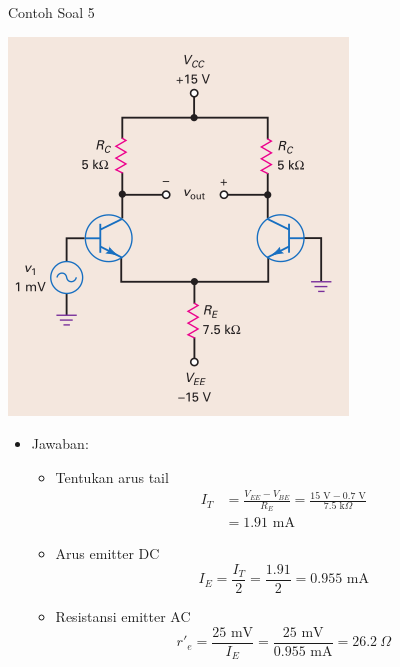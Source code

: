 \documentclass[aspectratio=169]{beamer}
\begin{document}
\begin{frame}{Contoh Soal 5}
	\begin{multicols}{2}
		\begin{center}
			\includegraphics[height=0.7\textheight]{gambar/01.contoh_soal_1-2}
		\end{center}
		\columnbreak
		\begin{itemize}
			\item Jawaban:
			\begin{itemize}
				\item Tentukan arus tail
				\begin{align*}
					I_T &= \frac{V_{EE} - V_{BE}}{R_E} = \frac{15 \text{ V} - 0.7 \text{ V}}{7.5 \text{ k}\Omega} \\
					&= 1.91 \text{ mA}
				\end{align*}
				\item Arus emitter DC
				\[ I_E = \frac{I_T}{2} = \frac{1.91}{2} = 0.955 \text{ mA}\]
				\item Resistansi emitter AC
				\[ r'_e = \frac{25 \text{ mV}}{ I_E} =\frac{25 \text{ mV}}{0.955 \text{ mA}} = 26.2~\Omega \]
			\end{itemize}
		\end{itemize}
	\end{multicols}
\end{frame}
\end{document}
